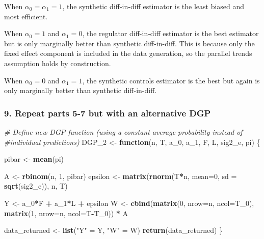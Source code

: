 \documentclass[
]{article}
\newenvironment{Shaded}{\begin{snugshade}}{\end{snugshade}}
\newcommand{\CommentTok}[1]{\textcolor[rgb]{0.56,0.35,0.01}{\textit{#1}}}
\newcommand{\ControlFlowTok}[1]{\textcolor[rgb]{0.13,0.29,0.53}{\textbf{#1}}}
\newcommand{\DataTypeTok}[1]{\textcolor[rgb]{0.13,0.29,0.53}{#1}}
\newcommand{\DecValTok}[1]{\textcolor[rgb]{0.00,0.00,0.81}{#1}}
\newcommand{\KeywordTok}[1]{\textcolor[rgb]{0.13,0.29,0.53}{\textbf{#1}}}
\newcommand{\NormalTok}[1]{#1}
\newcommand{\OperatorTok}[1]{\textcolor[rgb]{0.81,0.36,0.00}{\textbf{#1}}}
\newcommand{\StringTok}[1]{\textcolor[rgb]{0.31,0.60,0.02}{#1}}
\begin{document}
When \(\alpha_0=\alpha_1=1\), the synthetic diff-in-diff estimator is
the least biased and most efficient.

When \(\alpha_0=1\) and \(\alpha_1=0\), the regulator diff-in-diff
estimator is the best estimator but is only marginally better than
synthetic diff-in-diff. This is because only the fixed effect component
is included in the data generation, so the parallel trends assumption
holds by construction.

When \(\alpha_0=0\) and \(\alpha_1=1\), the synthetic controls estimator
is the best but again is only marginally better than synthetic
diff-in-diff.

\hypertarget{repeat-parts-5-7-but-with-an-alternative-dgp}{%
\subsubsection{9. Repeat parts 5-7 but with an alternative
DGP}\label{repeat-parts-5-7-but-with-an-alternative-dgp}}

\begin{Shaded}
\begin{Highlighting}[]
\CommentTok{# Define new DGP function (using a constant average probability instead of }
\CommentTok{#individual predictions)}
\NormalTok{DGP_}\DecValTok{2}\NormalTok{ <-}\StringTok{ }\ControlFlowTok{function}\NormalTok{(n, T, a_}\DecValTok{0}\NormalTok{, a_}\DecValTok{1}\NormalTok{, F, L, sig2_e, pi) \{}
  
\NormalTok{  pibar <-}\StringTok{ }\KeywordTok{mean}\NormalTok{(pi)}
  
\NormalTok{  A <-}\StringTok{ }\KeywordTok{rbinom}\NormalTok{(n, }\DecValTok{1}\NormalTok{, pibar)}
\NormalTok{  epsilon <-}\StringTok{ }\KeywordTok{matrix}\NormalTok{(}\KeywordTok{rnorm}\NormalTok{(T}\OperatorTok{*}\NormalTok{n, }\DataTypeTok{mean=}\DecValTok{0}\NormalTok{, }\DataTypeTok{sd =} \KeywordTok{sqrt}\NormalTok{(sig2_e)), n, T)}
  
\NormalTok{  Y <-}\StringTok{ }\NormalTok{a_}\DecValTok{0}\OperatorTok{*}\NormalTok{F }\OperatorTok{+}\StringTok{ }\NormalTok{a_}\DecValTok{1}\OperatorTok{*}\NormalTok{L }\OperatorTok{+}\StringTok{ }\NormalTok{epsilon }
\NormalTok{  W <-}\StringTok{ }\KeywordTok{cbind}\NormalTok{(}\KeywordTok{matrix}\NormalTok{(}\DecValTok{0}\NormalTok{, }\DataTypeTok{nrow=}\NormalTok{n, }\DataTypeTok{ncol=}\NormalTok{T_}\DecValTok{0}\NormalTok{), }\KeywordTok{matrix}\NormalTok{(}\DecValTok{1}\NormalTok{, }\DataTypeTok{nrow=}\NormalTok{n, }\DataTypeTok{ncol=}\NormalTok{T}\OperatorTok{-}\NormalTok{T_}\DecValTok{0}\NormalTok{)) }\OperatorTok{*}\StringTok{ }\NormalTok{A}
  
\NormalTok{  data_returned <-}\StringTok{ }\KeywordTok{list}\NormalTok{(}\StringTok{"Y"}\NormalTok{ =}\StringTok{ }\NormalTok{Y, }\StringTok{"W"}\NormalTok{ =}\StringTok{ }\NormalTok{W)}
  \KeywordTok{return}\NormalTok{(data_returned)}
\NormalTok{\}}
\end{Highlighting}
\end{Shaded}
\end{document}
